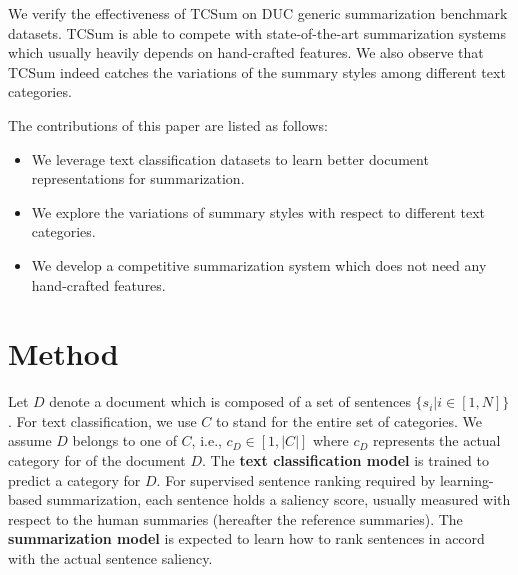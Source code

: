 \documentclass[letterpaper]{article}
\begin{document}

We verify the effectiveness of TCSum on DUC generic summarization benchmark datasets.
TCSum is able to compete with state-of-the-art summarization systems which usually heavily depends on hand-crafted features.
We also observe that TCSum indeed catches the variations of the summary styles among different text categories.

The contributions of this paper are listed as follows:
\begin{itemize}
	\item We leverage text classification datasets to learn better document representations for summarization.
	\item We explore the variations of summary styles with respect to different text categories.
	\item We develop a competitive summarization system which does not need any hand-crafted features.
\end{itemize}

\section{Method}

Let $D$ denote a document which is composed of a set of sentences $\{ {s_i}|i \in [1,N]\} $.
For text classification, we use $C$ to stand for the entire set of categories.
We assume $D$ belongs to one of $C$, i.e., $c_D \in [1,|C|]$ where $c_D$ represents the actual category for of the document $D$.
The \textbf{text classification model} is trained to predict a category for $D$.
For supervised sentence ranking required by learning-based summarization, each sentence holds a saliency score, usually measured with respect to the human summaries (hereafter the reference summaries).
The \textbf{summarization model} is expected to learn how to rank sentences in accord with the actual sentence saliency.
\end{document}
